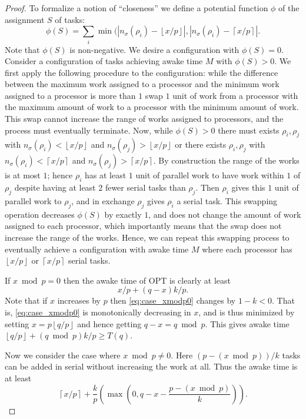 \documentclass[twocolumn]{article}[10pt]
\newcommand{\floor}[1]{\left\lfloor #1 \right\rfloor}
\newcommand{\ceil}[1]{\left\lceil #1 \right\rceil}
\newcommand{\paren}[1]{\left( #1 \right)}
\begin{document}
\begin{proof}
  To formalize a notion of \enquote{closeness} we define a potential 
  function $\phi$ of the assignment $S$ of tasks:
  $$\phi(S) = \sum_{i} \min(|n_\sigma(\rho_i)-\floor{x/p}|, |n_\sigma(\rho_i)-\ceil{x/p}|.$$ 
  Note that $\phi(S)$ is non-negative. We desire a configuration with $\phi(S) = 0$.
  Consider a configuration of tasks achieving awake time $M$ with $\phi(S) > 0$.
  We first apply the following procedure to the configuration:
  while the difference between the maximum work assigned to a
  processor and the minimum work assigned to a processor is more
  than $1$ swap $1$ unit of work from a processor with the
  maximum amount of work to a processor with the minimum amount
  of work. This swap cannot increase the range of works assigned
  to processors, and the process must eventually terminate.
  Now, while $\phi(S) > 0$ there must 
  exists $\rho_i, \rho_j$ with $n_\sigma(\rho_i) < \floor{x/p}$
  and $n_\sigma(\rho_j) > \floor{x/p}$ or there exists $\rho_i,
  \rho_j$ with $n_\sigma(\rho_i) < \ceil{x/p}$ and
  $n_\sigma(\rho_j) > \ceil{x/p}$. By construction the range of
  the works is at most $1$; hence $\rho_i$ has at least $1$ unit
  of parallel work to have work within $1$ of $\rho_j$ despite
  having at least $2$ fewer serial tasks than $\rho_j$. Then
  $\rho_i$ gives this $1$ unit of parallel work to $\rho_j$, and
  in exchange $\rho_j$ gives $\rho_i$ a serial task. This
  swapping operation decreases $\phi(S)$ by exactly $1$, and does
  not change the amount of work assigned to each processor, which
  importantly means that the swap does not increase the range of
  the works. Hence, we can repeat this swapping process to
  eventually achieve a configuration with awake time $M$ where each 
  processor has $\floor{x/p}$ or $\ceil{x/p}$ serial tasks.

  If $x\bmod p = 0$ then the awake time of OPT is clearly at
  least 
  \begin{equation} \label{eq:case_xmodp0}
    x/p + (q-x)k/p.
  \end{equation}
  Note that if $x$ increases by $p$ then \eqref{eq:case_xmodp0}
  changes by $1-k < 0$. That is, \eqref{eq:case_xmodp0} is
  monotonically decreasing in $x$, and is thus minimized by
  setting $x = p\floor{q/p}$ and hence getting $q-x = q\bmod p$.
  This gives awake time $\floor{q/p} + (q\bmod p)k/p \ge T(q)$.

  Now we consider the case where $x\bmod p \neq 0$. Here $(p -
  (x\bmod p))/k$ tasks can be added in serial without
  increasing the work at all. Thus the awake time is at least
  \begin{equation} \label{eq:case_xmodpnot0}
    \ceil{x/p} + \frac{k}{p}\paren{\max\paren{0, q-x - \frac{p-(x\bmod p)}{k}}}.
  \end{equation}


\end{proof}
\end{document}
